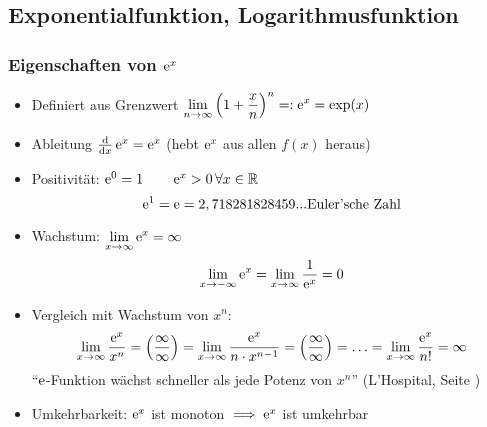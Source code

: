 \subsection{Exponentialfunktion, Logarithmusfunktion}
\subsubsection*{Eigenschaften von $\operatorname{e}^x$}
\begin{itemize}
    \item Definiert aus Grenzwert $\displaystyle\lim_{n \to \infty}\left(1+\frac{x}{n}\right)^n =: \operatorname{e}^x = \exp(x)$
    \item Ableitung $\frac{\mathrm d}{\mathrm d x}\operatorname{e}^x = \operatorname{e}^x$ (hebt $\operatorname{e}^x$ aus allen $f(x)$ heraus)
    \item Positivität: $\operatorname{e}^0 = 1 \qquad \operatorname{e}^x > 0 \, \forall x \in \mathbb{R}$
            \[\operatorname{e}^1=\operatorname{e}=2,718281828459... \text{Euler'sche Zahl}\]
    \item Wachstum: $\displaystyle\lim_{x \to \infty} \operatorname{e}^x = \infty$
            \[\lim_{x \to -\infty} \operatorname{e}^x = \lim_{x \to \infty} \frac{1}{\operatorname{e}^x} = 0\]
    \item Vergleich mit Wachstum von $x^n$:
        \begin{align*}
            \lim_{x \to \infty} \frac{\operatorname{e}^x}{x^n} = \left(\frac{\infty}{\infty}\right) = \lim_{x \to \infty}\frac{\operatorname{e}^x}{n\cdot x^{n-1}} = \left(\frac{\infty}{\infty}\right) = \ldots =  \lim_{x \to \infty}\frac{\operatorname{e}^x}{n!} = \infty
        \end{align*}
        "`$\operatorname{e}$-Funktion wächst schneller als jede Potenz von $x^n$"' (L'Hospital, Seite \pageref{theorem:hospital})
    \item Umkehrbarkeit: $\operatorname{e}^x$ ist monoton $\implies \operatorname{e}^x$ ist umkehrbar
\end{itemize}

\begin{center}
\end{center}

